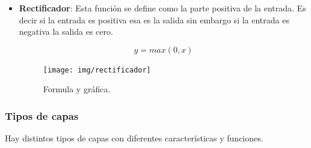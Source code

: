 \documentclass[12pt,a4paper]{article}
\begin{document}
\begin{itemize}
\item \textbf{Rectificador}: Esta función se define como la parte positiva de la entrada. Es decir si la entrada es positiva esa es la salida sin embargo si la entrada es negativa la salida es cero.

\begin{figure}[H]
\centering\begin{minipage}[H]{0.5\textwidth}
\large
\begin{equation*}
y = max(0, x)
\end{equation*}
\end{minipage}%
\begin{minipage}[t]{0.5\textwidth}
\texttt{[image: img/rectificador]}
\end{minipage}
\caption{Formula y gráfica.}
\end{figure}

\end{itemize}

\subsubsection{Tipos de capas}
Hay distintos tipos de capas con diferentes características y funciones.
\end{document}
